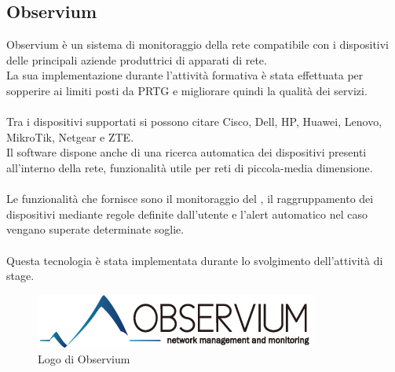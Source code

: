 \documentclass[Tesi.tex]{subfiles}
\begin{document}
\subsection{Observium}
Observium è un sistema di monitoraggio della rete compatibile con i dispositivi delle principali aziende produttrici di apparati di rete. \\
La sua implementazione durante l'attività formativa è stata effettuata per sopperire ai limiti posti da PRTG e migliorare quindi la qualità dei servizi. \\\\
Tra i dispositivi supportati si possono citare Cisco, Dell, HP, Huawei, Lenovo, MikroTik, Netgear e ZTE. \\
Il software dispone anche di una ricerca automatica dei dispositivi presenti all'interno della rete, funzionalità utile per reti di piccola-media dimensione. \\\\
Le funzionalità che fornisce sono il monitoraggio del , il raggruppamento dei dispositivi mediante regole definite dall'utente e l'alert automatico nel caso vengano superate determinate soglie.\\\\
Questa tecnologia è stata implementata durante lo svolgimento dell'attività di stage.

\begin{figure}[H]
	\centering
	\includegraphics[width=0.4\linewidth]{"images/logo/Observium_logo"}
	\caption{Logo di Observium}
	\label{fig:Logo di Observium}
\end{figure}
\end{document}
